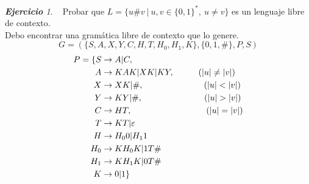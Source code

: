 \documentclass[12pt,spanish]{article}
\theoremstyle{definition}
\theoremstyle{remark}
\newtheorem{exercise}{\textbf{Ejercicio}}%
\begin{document}
\begin{exercise}~ Probar que
  $L=\{u\# v \ |\ u,v \in \{0,1\}^*,\ u\neq v\}$ es un lenguaje libre
  de contexto. \\

  Debo encontrar una gramática libre de contexto que lo genere.
  \[G=(\{S,A,X,Y,C,H,T,H_0,H_1,K\},\{0,1,\#\},P,S)\]
  \vspace{-10mm}
  \begin{align*}
    P=\{S&\rightarrow A|C, \\
    A&\rightarrow KAK|XK|KY, \hspace{10mm}   (|u|\neq |v|) \\
    X&\rightarrow XK|\#,     \hspace{24.9mm} (|u| < |v|) \\
    Y&\rightarrow KY|\#,     \hspace{25.4mm} (|u| > |v|) \\
    C&\rightarrow HT,        \hspace{30.6mm} (|u|=|v|) \\
    T&\rightarrow KT|\varepsilon \\
    H&\rightarrow H_00|H_11 \\
    H_0&\rightarrow KH_0K|1T\# \\
    H_1&\rightarrow KH_1K|0T\# \\
    K&\rightarrow 0|1\}
  \end{align*}
\end{exercise}

\setcounter{exercise}{20}

~
\end{document}
